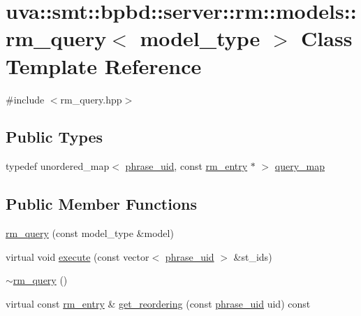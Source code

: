 \hypertarget{classuva_1_1smt_1_1bpbd_1_1server_1_1rm_1_1models_1_1rm__query}{}\section{uva\+:\+:smt\+:\+:bpbd\+:\+:server\+:\+:rm\+:\+:models\+:\+:rm\+\_\+query$<$ model\+\_\+type $>$ Class Template Reference}
\label{classuva_1_1smt_1_1bpbd_1_1server_1_1rm_1_1models_1_1rm__query}


{\ttfamily \#include $<$rm\+\_\+query.\+hpp$>$}

\subsection*{Public Types}
\begin{DoxyCompactItemize}
\item 
typedef unordered\+\_\+map$<$ \hyperlink{namespaceuva_1_1smt_1_1bpbd_1_1server_ad18d4cdf5504e76c22b0c124ff60b44f}{phrase\+\_\+uid}, const \hyperlink{namespaceuva_1_1smt_1_1bpbd_1_1server_1_1rm_1_1models_a67353bb21590b2a2adf05500899439ed}{rm\+\_\+entry} $\ast$ $>$ \hyperlink{classuva_1_1smt_1_1bpbd_1_1server_1_1rm_1_1models_1_1rm__query_a2ce9a5b1ffe611cca1ebf768d85aa4c9}{query\+\_\+map}
\end{DoxyCompactItemize}
\subsection*{Public Member Functions}
\begin{DoxyCompactItemize}
\item 
\hyperlink{classuva_1_1smt_1_1bpbd_1_1server_1_1rm_1_1models_1_1rm__query_a22e59e495920cee9ae789b64a23df412}{rm\+\_\+query} (const model\+\_\+type \&model)
\item 
virtual void \hyperlink{classuva_1_1smt_1_1bpbd_1_1server_1_1rm_1_1models_1_1rm__query_a9c40ada6f125480ee9d953f9005f9244}{execute} (const vector$<$ \hyperlink{namespaceuva_1_1smt_1_1bpbd_1_1server_ad18d4cdf5504e76c22b0c124ff60b44f}{phrase\+\_\+uid} $>$ \&st\+\_\+ids)
\item 
\hyperlink{classuva_1_1smt_1_1bpbd_1_1server_1_1rm_1_1models_1_1rm__query_a1a791f89b0fd004ca7ac6f89fa78fae9}{$\sim$rm\+\_\+query} ()
\item 
virtual const \hyperlink{namespaceuva_1_1smt_1_1bpbd_1_1server_1_1rm_1_1models_a67353bb21590b2a2adf05500899439ed}{rm\+\_\+entry} \& \hyperlink{classuva_1_1smt_1_1bpbd_1_1server_1_1rm_1_1models_1_1rm__query_ab7fc2be2d301546d68e46716b5680151}{get\+\_\+reordering} (const \hyperlink{namespaceuva_1_1smt_1_1bpbd_1_1server_ad18d4cdf5504e76c22b0c124ff60b44f}{phrase\+\_\+uid} uid) const 
\end{DoxyCompactItemize}



